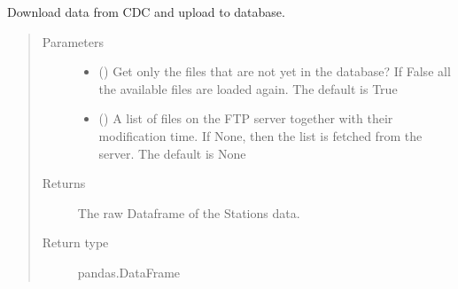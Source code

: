 \documentclass[letterpaper,10pt,english]{sphinxmanual}
\begin{document}
\begin{fulllineitems}

\begin{fulllineitems}
\label{\detokenize{weatherDB:weatherDB.station.StationBase.update_raw}}
\sphinxAtStartPar
Download data from CDC and upload to database.
\begin{quote}\begin{description}
\item[{Parameters}] \leavevmode\begin{itemize}
\item {} 
\sphinxAtStartPar
{} (\sphinxstyleliteralemphasis{\sphinxupquote{, }}) \textendash{} Get only the files that are not yet in the database?
If False all the available files are loaded again.
The default is True

\item {} 
\sphinxAtStartPar
{} (\sphinxstyleliteralemphasis{\sphinxupquote{ (}}\sphinxstyleliteralemphasis{\sphinxupquote{, }}\sphinxstyleliteralemphasis{\sphinxupquote{)}}\sphinxstyleliteralemphasis{\sphinxupquote{, }}) \textendash{} A list of files on the FTP server together with their modification time.
If None, then the list is fetched from the server.
The default is None

\end{itemize}

\item[{Returns}] \leavevmode
\sphinxAtStartPar
The raw Dataframe of the Stations data.

\item[{Return type}] \leavevmode
\sphinxAtStartPar
pandas.DataFrame

\end{description}\end{quote}

\end{fulllineitems}


\end{fulllineitems}
\end{document}
